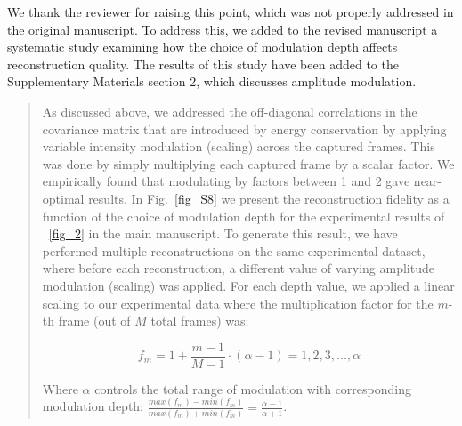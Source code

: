 \documentclass[12pt]{article}
\newenvironment{ourresponse}
    {\begin{tcolorbox}[width=\linewidth,breakable,enhanced,colback=gray!5,colframe=responsecolor!50,title=Response,left=5pt,right=5pt]}
    {\end{tcolorbox}}
\begin{document}
\begin{ourresponse}
We thank the reviewer for raising this point, which was not properly addressed in the original manuscript. To address this, we added to the revised manuscript a systematic study examining how the choice of modulation depth affects reconstruction quality. The results of this study have been added to the Supplementary Materials section 2, which discusses amplitude modulation.



\begin{quote}

As discussed above, we addressed the off-diagonal correlations in the covariance matrix that are introduced by energy conservation by applying variable intensity modulation (scaling) across the captured frames. This was done by simply multiplying each captured frame by a scalar factor. We empirically found that modulating by factors between 1 and 2 gave near-optimal results. In Fig.~\ref{fig_S8} we present the reconstruction fidelity as a function of the choice of modulation depth for the experimental results of ~\ref{fig_2} in the main manuscript. To generate this result, we have performed multiple reconstructions on the same experimental dataset, where before each reconstruction, a different value of varying amplitude modulation (scaling) was applied. For each depth value, we applied a linear scaling to our experimental data where the multiplication factor for the $m$-th frame (out of $M$ total frames) was:


\begin{equation}
    f_m = 1 + \frac{m-1}{M-1} \cdot (\alpha -1) = 1, 2, 3, ..., \alpha
\end{equation}

Where $\alpha$ controls the total range of modulation with corresponding modulation depth: $\frac{max(f_m)-min(f_m)}{max(f_m)+min(f_m)}=\frac{\alpha-1}{\alpha+1}$.


\end{quote}
\end{ourresponse}
\end{document}
